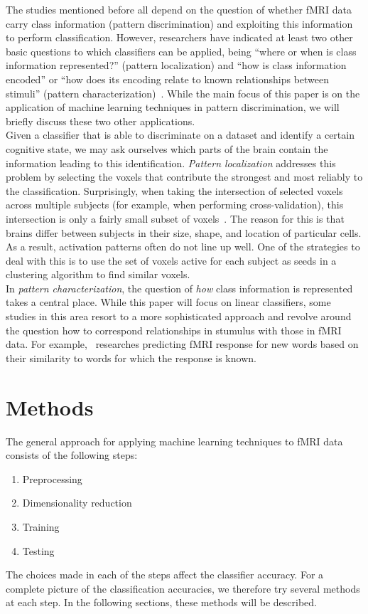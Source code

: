 \documentclass[preprint,journal,11pt]{vgtc}
\begin{document}
The studies mentioned before all depend on the question of whether fMRI data carry class
information (pattern discrimination) and exploiting this information to perform classification. However, researchers have indicated at least two other basic questions to which classifiers can be applied, being ``where or when
is class information represented?'' (pattern localization) and ``how is
class information encoded'' or ``how does its encoding relate to known
relationships between stimuli'' (pattern characterization)~\cite{pereira2009machine}. While the main focus of this paper is on the application of machine learning techniques in pattern discrimination, we will briefly discuss these two other applications.\\

Given a classifier that is able to discriminate on a dataset and identify a certain cognitive state, we may ask ourselves which parts of the brain contain the information leading to this identification. \emph{Pattern localization} addresses this problem by selecting the voxels that contribute the strongest and most reliably to the classification. Surprisingly, when taking the intersection of selected voxels across multiple subjects (for example, when performing cross-validation), this intersection is only a fairly small subset of voxels~\cite{pereira2009machine}. The reason for this is that brains differ between subjects in their size, shape, and location of particular cells. As a result, activation patterns often do not line up well. One of the strategies to deal with this is to use the set of voxels active for each subject as seeds in a clustering algorithm to find similar voxels.\\

In \emph{pattern characterization}, the question of \emph{how} class information is represented takes a central place. While this paper will focus on linear classifiers, some studies in this area resort to a more sophisticated approach and revolve around the question how to correspond relationships in stumulus with those in fMRI data. For example,~\cite{mitchell2008predicting} researches predicting fMRI response for new words based on their similarity to words for which the response is known.


\section{Methods}
\label{sec:methods}
The general approach for applying machine learning techniques to fMRI data consists of the following steps:
\begin{enumerate}
  \item Preprocessing
  \item Dimensionality reduction
  \item Training
  \item Testing
\end{enumerate}
The choices made in each of the steps affect the classifier accuracy. For a complete picture of the classification accuracies, we therefore try several methods at each step. In the following sections, these methods will be described.
\end{document}
